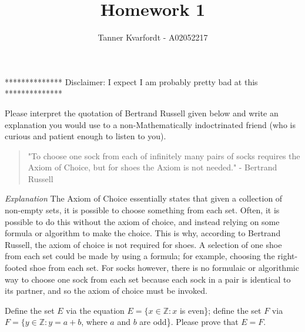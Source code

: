 \documentclass[12pt]{article}
\newenvironment{problem}[2][Problem]{\begin{trivlist}
\item[\hskip \labelsep {\bfseries #1}\hskip \labelsep {\bfseries #2.}]}{\end{trivlist}}
\begin{document}
 
 
\title{Homework 1}
\author{Tanner Kvarfordt - A02052217}
\maketitle

\begin{center}
************** Disclaimer: I expect I am probably pretty bad at this **************
\end{center}
 
\begin{problem}{1}
Please interpret the quotation of Bertrand Russell given below and write an explanation you would use to a non-Mathematically
indoctrinated friend (who is curious and patient enough to listen to you).
\end{problem}
 
\begin{quote}
"To choose one sock from each of infinitely many pairs of socks requires the Axiom of Choice, but for shoes
the Axiom is not needed." \newline - Bertrand Russell
\end{quote}

\begin{description}
\item \textit{Explanation} The Axiom of Choice essentially states that given a collection of non-empty sets, it is possible to choose something from each set. Often, it is possible to do this without the axiom of choice, and instead relying on some formula or algorithm to make the choice. This is why, according to Bertrand Russell, the axiom of choice is not required for shoes. A selection of one shoe from each set could be made by using a formula; for example, choosing the right-footed shoe from each set. For socks however, there is no formulaic or algorithmic way to choose one sock from each set because each sock in a pair is identical to its partner, and so the axiom of choice must be invoked.
\end{description}

\begin{problem}{2}
Define the set $E$ via the equation $E = \{x \in\mathbb{Z} : x$ is even\}; define the set $F$ via $F = \{y \in\mathbb{Z} : y = a + b$, where $a$ and $b$ are odd\}. Please prove that $E = F$. 
\end{problem}
\end{document}
